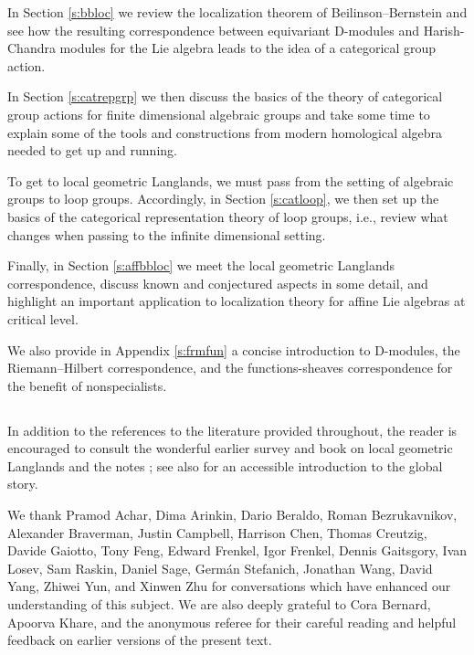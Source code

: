 \documentclass[10pt]{amsart}
\theoremstyle{remark}
\numberwithin{equation}{section}
\begin{document}
	In Section \ref{s:bbloc} we review the localization theorem of 
	Beilinson--Bernstein and see how the resulting correspondence between 
	equivariant D-modules and Harish-Chandra modules for the Lie algebra leads 
	to the idea of a categorical group action.
	
	In Section \ref{s:catrepgrp} we then discuss the basics of the theory of 
	categorical group actions for finite dimensional algebraic groups and take 
	some time to explain some of the 
	 tools and constructions from modern homological algebra needed to get up 
	 and running.
	 
To get to local geometric Langlands, we must pass from the setting of algebraic 
groups to loop groups. Accordingly, in Section \ref{s:catloop}, we then set up 
the basics of the categorical representation theory of loop groups, i.e., review what changes when passing to the infinite dimensional setting. 
	
	
	Finally, in Section \ref{s:affbbloc} we meet the local geometric Langlands 
	correspondence, discuss known and conjectured aspects in some detail, and 
	highlight an important application to localization theory for affine Lie 
	algebras at critical level. 
	
	We also provide in Appendix \ref{s:frmfun} a concise introduction to 
	D-modules, the Riemann--Hilbert correspondence, and the functions-sheaves 
	correspondence for the benefit of nonspecialists. 
	
	
	 
	 
	 \subsection{} In addition to the references to the literature provided throughout, the reader is encouraged to consult the wonderful earlier survey \cite{frenkellocalnotes} and book \cite{frenkelloop} on local geometric Langlands and the notes \cite{paris-notes}; see also \cite{frenkelglobalnotes} for an accessible introduction to the global story. 
	

	
	\vspace{.5cm}
	
	 We thank Pramod Achar, Dima Arinkin, Dario Beraldo, 
	Roman 
	Bezrukavnikov, Alexander Braverman, Justin Campbell, Harrison Chen, Thomas Creutzig,  Davide 
	Gaiotto, 
	Tony Feng,  Edward 
	Frenkel, Igor Frenkel,  
	Dennis Gaitsgory, Ivan Losev, Sam Raskin, Daniel Sage, Germ\'an Stefanich, Jonathan Wang, 
	David Yang, Zhiwei Yun, and Xinwen Zhu for conversations which have enhanced our 
	understanding of this subject. We are also deeply grateful to Cora Bernard, Apoorva Khare, and the anonymous referee for their careful reading and helpful feedback on earlier versions of the present text. 
	
\end{document}
